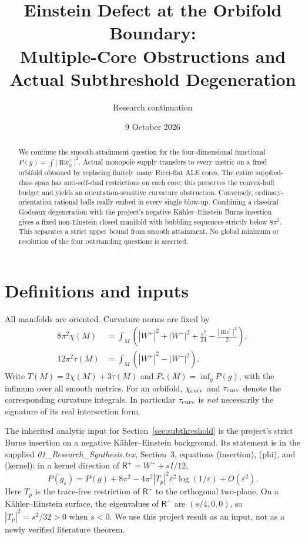 \documentclass[11pt]{article}
\title{Einstein Defect at the Orbifold Boundary:\\Multiple-Core Obstructions and Actual Subthreshold Degeneration}
\author{Research continuation}
\date{9 October 2026}
\newcommand{\Ric}{\operatorname{Ric}}
\begin{document}
\maketitle
\begin{abstract}
We continue the smooth-attainment question for the four-dimensional functional
$P(g)=\int|\Ric_g^\circ|^2$. Actual monopole supply transfers to every metric
on a fixed orbifold obtained by replacing finitely many Ricci-flat ALE cores.
The entire supplied-class span has anti-self-dual restrictions on each core;
this preserves the convex-hull budget and yields an orientation-sensitive
curvature obstruction. Conversely, ordinary-orientation rational balls really
embed in every single blow-up. Combining a classical Godeaux degeneration with
the project's negative K\"ahler--Einstein Burns insertion gives a fixed
non-Einstein closed manifold with bubbling sequences strictly below
$8\pi^2$. This separates a strict upper bound from smooth attainment.
No global minimum or resolution of the four outstanding questions is asserted.
\end{abstract}

\section{Definitions and inputs}
All manifolds are oriented. Curvature norms are fixed by
\begin{align}
8\pi^2\chi(M)&=\int_M\left(|W^+|^2+|W^-|^2+\frac{s^2}{24}
                           -\frac{|\Ric^\circ|^2}{2}\right),\label{eq:gb}\\
12\pi^2\tau(M)&=\int_M(|W^+|^2-|W^-|^2).
\end{align}
Write $T(M)=2\chi(M)+3\tau(M)$ and
$P_*(M)=\inf_g P(g)$, with the infimum over all smooth metrics.
For an orbifold, $\chi_{\rm curv}$ and $\tau_{\rm curv}$ denote the
corresponding curvature integrals. In particular $\tau_{\rm curv}$ is
\emph{not} necessarily the signature of its real intersection form.

The inherited analytic input for Section~\ref{sec:subthreshold} is the
project's strict Burns insertion on a negative K\"ahler--Einstein background.
Its statement is in the supplied \emph{01\_Research\_Synthesis.tex},
Section~3, equations (insertion), (phi), and (kernel): in a kernel direction of
$\mathsf R^+=W^++sI/12$,
\begin{equation}
 P(g_\varepsilon)=P(g)+8\pi^2
 -4\pi^2|T_p|^2\varepsilon^2\log(1/\varepsilon)+O(\varepsilon^2).
 \label{eq:burns}
\end{equation}
Here $T_p$ is the trace-free restriction of $\mathsf R^+$ to the orthogonal
two-plane. On a K\"ahler--Einstein surface, the eigenvalues of $\mathsf R^+$
are $(s/4,0,0)$, so $|T_p|^2=s^2/32>0$ when $s<0$.
We use this project result as an input, not as a newly verified literature theorem.
\end{document}
